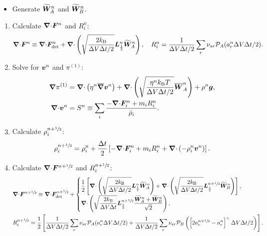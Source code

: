 \documentclass[
10pt
showpacs, showkeys,
amsmath,amssymb,
aps,
pre,
floatfix,
]{revtex4-1}
\newcommand{\divg}{{\V\nabla\cdot}}                       %
\newcommand{\paren}[1]{{(#1)}}                            %
\begin{document}
\begin{itemize}
\item Generate $\widetilde{\boldsymbol{W}}^n_A$ and $\widetilde{\boldsymbol{W}}^n_B$.
\end{itemize}

\begin{enumerate}

\item Calculate $\divg\V{F}^n$ and $R^n_i$:
\begin{equation}
\divg\V{F}^n \equiv \divg\V{F}^n_\mathrm{det} + \divg\left( \sqrt{ \frac{2k_\mathrm{B}}{\D{V}\D{t}/2} } \V{L}^n_{\frac12} \widetilde{\V{W}}^n_A \right),
\quad R^n_i = \frac{1}{\D{V}\D{t}/2} \sum_r \nu_{sr} \mathcal{P}_A(a^n_r\D{V}\D{t}/2).
\end{equation}

\item Solve for $\boldsymbol{v}^n$ and $\pi^\paren{1}$:
\begin{align}
\label{overdamped_stokes_v_1st}
\grad\pi^\paren{1} & = \divg\left( \eta^n \overline{\grad}\V{v}^n \right)
+ \divg\left( \sqrt{\frac{\eta^n k_\mathrm{B}T}{\D{V}\D{t}/2}} \overline{\V{W}}^n_A \right) + \rho^n\V{g},
\\
\label{overdamped_stokes_p_1st}
\divg\V{v}^n & = S^n\equiv \sum_i \frac{-\divg\V{F}^n_i + m_i R^n_i }{\bar{\rho}_i}.
\end{align}

\item Calculate $\rho^{n+\sfrac{1}{2}}_i$:
\begin{equation}
\rho^{n+\myhalf}_i = \rho^n_i + \frac{\D{t}}{2} \left[ -\divg\V{F}^n_i + m_i R^n_i + \divg\left( -\rho^n_i \V{v}^n \right) \right].
\end{equation}

\item Calculate $\divg\V{F}^{n+\myhalf}$ and $R^{n+\sfrac{1}{2}}_i$:
\begin{align}
&\divg\V{F}^{n+\myhalf} \equiv \divg\V{F}_\mathrm{det}^{n+\myhalf} +
\begin{cases}
\displaystyle
\frac{1}{2}\left[ 
\divg\left( \sqrt{ \frac{2k_\mathrm{B}}{\D{V}\D{t}/2} } \V{L}^n_{\frac12} \widetilde{\V{W}}^n_A \right) 
+\divg\left( \sqrt{ \frac{2k_\mathrm{B}}{\D{V}\D{t}/2} } \V{L}^{n+\myhalf}_{\frac12} \widetilde{\V{W}}^n_B \right) 
\right],\\
\displaystyle
\divg\left( \sqrt{ \frac{2k_\mathrm{B}}{\D{V}\D{t}} } \V{L}^{n+\myhalf}_{\frac12} \frac{\widetilde{\V{W}}^n_A+\widetilde{\V{W}}^n_B}{\sqrt{2}} \right),
\end{cases}
\\
&R^{n+\myhalf}_i = \frac{1}{2}\left[ \frac{1}{\D{V}\D{t}/2} \sum_r \nu_{sr} \mathcal{P}_A(a^n_r\D{V}\D{t}/2) + \frac{1}{\D{V}\D{t}/2} \sum_r \nu_{sr} \mathcal{P}_B\left( \left[ 2 a^{n+\myhalf}_r - a^n_r \right]^+ \D{V}\D{t}/2 \right) \right].
\end{align}


\end{enumerate}
\end{document}
